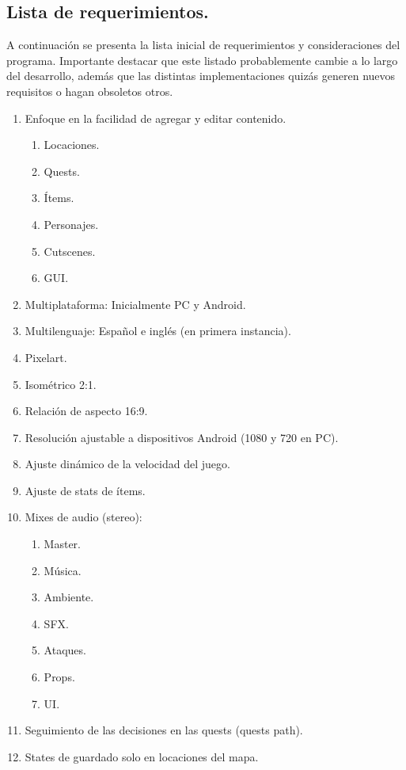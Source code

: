 \subsection{Lista de requerimientos.}\label{intro:lista-de-requerimientos}
A continuación se presenta la lista inicial de requerimientos y consideraciones del programa. Importante destacar que este listado probablemente cambie a lo largo del desarrollo, además que las distintas implementaciones quizás generen nuevos requisitos o hagan obsoletos otros.

\begin{enumerate}
	\item Enfoque en la facilidad de agregar y editar contenido.
	\begin{enumerate}
		\item Locaciones.
		\item Quests.
		\item Ítems.
		\item Personajes.
		\item Cutscenes.
		\item GUI.
	\end{enumerate}
	\item Multiplataforma: Inicialmente PC y Android.
	\item Multilenguaje: Español e inglés (en primera instancia).
	\item Pixelart.
	\item Isométrico 2:1.
	\item Relación de aspecto 16:9.
	\item Resolución ajustable a dispositivos Android (1080 y 720 en PC).
	\item Ajuste dinámico de la velocidad del juego.
	\item Ajuste de stats de ítems.
	\item Mixes de audio (stereo):
	\begin{enumerate}	
		\item Master.
		\item Música.
		\item Ambiente.
		\item SFX.
		\item Ataques.
		\item Props.
		\item UI.
	\end{enumerate}
	\item Seguimiento de las decisiones en las quests (quests path).
	\item States de guardado solo en locaciones del mapa.

\end{enumerate}
